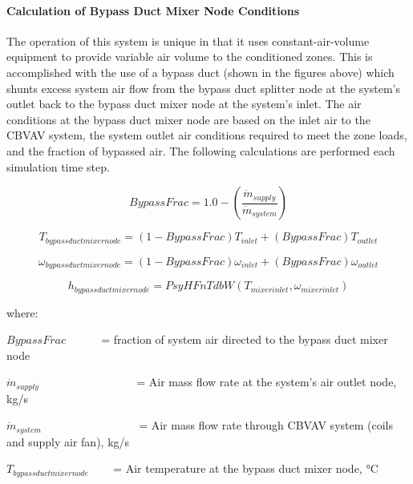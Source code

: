 \paragraph{Calculation of Bypass Duct Mixer Node Conditions}\label{calculation-of-bypass-duct-mixer-node-conditions}

The operation of this system is unique in that it uses constant-air-volume equipment to provide variable air volume to the conditioned zones. This is accomplished with the use of a bypass duct (shown in the figures above) which shunts excess system air flow from the bypass duct splitter node at the system's outlet back to the bypass duct mixer node at the system's inlet. The air conditions at the bypass duct mixer node are based on the inlet air to the CBVAV system, the system outlet air conditions required to meet the zone loads, and the fraction of bypassed air. The following calculations are performed each simulation time step.

\begin{equation}
BypassFrac = 1.0 - \left( {\frac{{{{\dot m}_{supply}}}}{{{{\dot m}_{system}}}}} \right)
\end{equation}

\begin{equation}
{T_{bypassductmixernode}} = \left( {1 - BypassFrac} \right){T_{inlet}} + \left( {BypassFrac} \right){T_{outlet}}
\end{equation}

\begin{equation}
{\omega_{bypassductmixernode}} = \left( {1 - BypassFrac} \right){\omega_{inlet}} + \left( {BypassFrac} \right){\omega_{outlet}}
\end{equation}

\begin{equation}
{h_{bypassductmixernode}} = PsyHFnTdbW\left( {{T_{mixerinlet}},{\omega_{mixerinlet}}} \right)
\end{equation}

where:

\(BypassFrac\) ~~~~~ = fraction of system air directed to the bypass duct mixer node

\({\dot m_{supply}}\) ~~~~~~~~~~~~~~~~ = Air mass flow rate at the system's air outlet node, kg/s

\({\dot m_{system}}\) ~~~~~~~~~~~~~~~~ = Air mass flow rate through CBVAV system (coils and supply air fan), kg/s

\({T_{bypassductmixernode}}\) ~~~ = Air temperature at the bypass duct mixer node, °C

